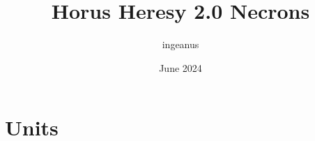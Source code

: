 \documentclass{article}
\title{Horus Heresy 2.0 Necrons}
\author{ingeanus}
\date{June 2024}
\begin{document}
	\renewcommand\thesection{}
	\renewcommand\thesubsection{}
	\renewcommand\thesubsubsection{}
	\contourlength{0.5pt} %
	
	\maketitle
	
	\tableofcontents
	
	\newpage
	
	
	\newpage
	
	
	\newpage
	
	
	\newpage
	
	
	\newpage
	\section{Units}
	
	
	\newpage
	
	
	\newpage
	
	
	\newpage
	
	
	\newpage
	
	
	\newpage
	
	
	\newpage
	
	
\end{document}
